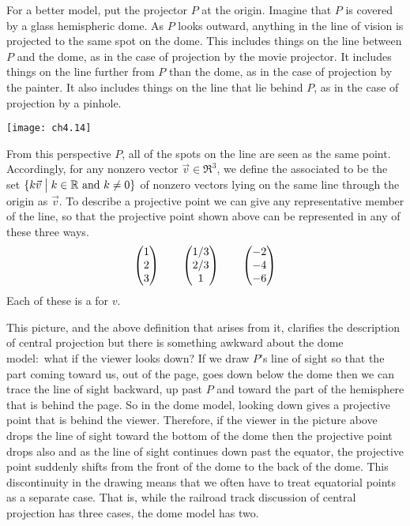 For a better model, put the projector $P$ at the origin.
Imagine that $P$ is covered by a glass hemispheric dome.
As $P$ looks outward, anything 
in the line of vision is projected to the same spot on the dome.
This includes things on the line between $P$ and the dome, as in the 
case of projection by the movie projector.
It includes things on the line further from $P$ than the dome,
as in the case of projection by the painter.
It also includes things on the line that lie behind $P$,
as in the case of projection by a pinhole.  
\begin{center} 
  \texttt{[image: ch4.14]}
\end{center}
From this perspective $P$, all of the spots on the line 
are seen as the same point.
Accordingly,
for any nonzero vector $\vec{v}\in\Re^3$, we define the associated 
to be the set $\mbox{$\{k\vec{v}\bigm| \text{$k\in\mathbb{R}$ and $k\neq 0$}\}$}$
of nonzero vectors lying on the same line through the
origin as $\vec{v}$.
To describe a projective point we can give any representative member 
of the line, so that
the projective point shown above 
can be represented in any of these three ways.
\begin{equation*}
  \begin{pmatrix} 1 \\ 2 \\ 3 \end{pmatrix}
  \qquad
  \begin{pmatrix} 1/3 \\ 2/3 \\ 1 \end{pmatrix}
  \qquad
  \begin{pmatrix} -2 \\ -4 \\ -6 \end{pmatrix}
\end{equation*} 
Each of these is a
%
for $v$. 

This picture, and the above definition that arises from it,
clarifies the description of central projection
but there is something awkward about the dome 
model:~what if the viewer looks down?
If we draw $P$'s line of sight so that the part 
coming toward us, out of the page,
goes down below the dome then we can trace
the line of sight backward, up past $P$ and toward the part of the
hemisphere that is behind the page.
So in the dome model, looking down gives a projective point 
that is behind the viewer. 
Therefore, if the viewer in the picture above
drops the line of sight toward the bottom of the
dome then the projective point drops also and as
the line of sight continues down past the equator, the projective point
suddenly shifts from the front of the dome to the back of the dome.
This discontinuity in the drawing means that
we often have to treat equatorial points as a separate case.
That is, while the railroad track discussion of central projection
has three cases,
the dome model has two.


